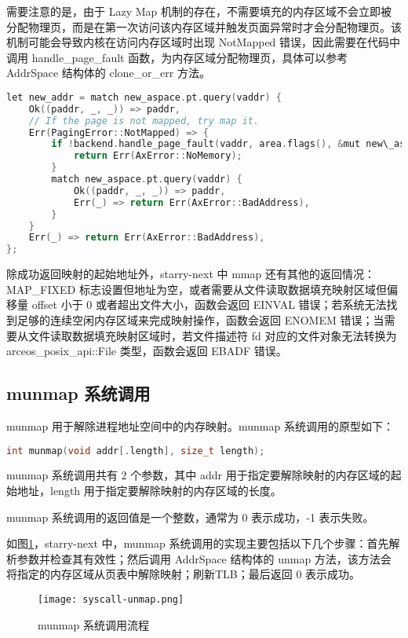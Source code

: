 需要注意的是，由于 Lazy Map 机制的存在，不需要填充的内存区域不会立即被分配物理页，而是在第一次访问该内存区域并触发页面异常时才会分配物理页。该机制可能会导致内核在访问内存区域时出现 NotMapped 错误，因此需要在代码中调用 handle\_page\_fault 函数，为内存区域分配物理页，具体可以参考 AddrSpace 结构体的 clone\_or\_err 方法。

\begin{lstlisting}[language=c, caption=Lazy Map 机制下访问内存区域的处理]
let new_addr = match new_aspace.pt.query(vaddr) {
    Ok((paddr, _, _)) => paddr,
    // If the page is not mapped, try map it.
    Err(PagingError::NotMapped) => {
        if !backend.handle_page_fault(vaddr, area.flags(), &mut new\_aspace.pt) {
            return Err(AxError::NoMemory);
        }
        match new_aspace.pt.query(vaddr) {
            Ok((paddr, _, _)) => paddr,
            Err(_) => return Err(AxError::BadAddress),
        }
    }
    Err(_) => return Err(AxError::BadAddress),
};
\end{lstlisting}


除成功返回映射的起始地址外，starry-next 中 mmap 还有其他的返回情况：MAP\_FIXED 标志设置但地址为空，或者需要从文件读取数据填充映射区域但偏移量 offset 小于 0 或者超出文件大小，函数会返回 EINVAL 错误；若系统无法找到足够的连续空闲内存区域来完成映射操作，函数会返回 ENOMEM 错误；当需要从文件读取数据填充映射区域时，若文件描述符 fd 对应的文件对象无法转换为 arceos\_posix\_api::File 类型，函数会返回 EBADF 错误。

\subsection{munmap 系统调用}

munmap 用于解除进程地址空间中的内存映射。munmap 系统调用的原型如下：
\begin{lstlisting}[language=c, caption=munmap 系统调用函数原型]
int munmap(void addr[.length], size_t length);
\end{lstlisting}
munmap 系统调用共有 2 个参数，其中 addr 用于指定要解除映射的内存区域的起始地址，length 用于指定要解除映射的内存区域的长度。

munmap 系统调用的返回值是一个整数，通常为 0 表示成功，-1 表示失败。


如图\ref{fig:munmap}，starry-next 中，munmap 系统调用的实现主要包括以下几个步骤：首先解析参数并检查其有效性；然后调用 AddrSpace 结构体的 unmap 方法，该方法会将指定的内存区域从页表中解除映射；刷新TLB；最后返回 0 表示成功。

\begin{figure}
    \centering
    \texttt{[image: syscall-unmap.png]}
    \caption{munmap 系统调用流程}
    \label{fig:munmap}
\end{figure}


